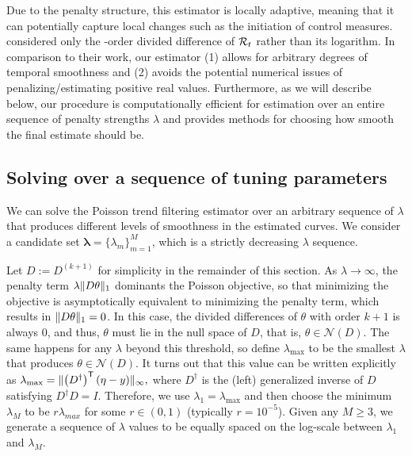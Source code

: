 Due to the penalty structure, this estimator is locally adaptive,
meaning that it can potentially capture local changes such as the initiation of
control measures. \cite{abry2020spatial,pascal2022nonsmooth} considered only the
\second-order divided difference of $\mathcal{R}_t$ rather than its logarithm. In
comparison to their work, our estimator (1) allows for arbitrary degrees of
temporal smoothness and (2) avoids the potential numerical issues of
penalizing/estimating positive real values. Furthermore, as we will describe
below, our procedure is computationally efficient for estimation over an entire
sequence of penalty strengths $\lambda$ and provides methods for choosing how
smooth the final estimate should be.


\subsection{Solving over a sequence of tuning parameters}
\label{sec:candidate-set}

We can solve the Poisson trend filtering estimator over an arbitrary sequence of 
$\lambda$ that produces different levels of smoothness in the estimated curves. 
We consider a candidate set $\boldsymbol{\lambda} = \{\lambda_m\}_{m=1}^M$, 
which is a strictly decreasing $\lambda$ sequence.%

Let $D := D^{(k+1)}$ for simplicity in the remainder of this section. As
$\lambda \to\infty$, the penalty term $\lambda \lVert D\theta \rVert_1$ dominants the
Poisson objective, so that minimizing the objective is asymptotically equivalent
to minimizing the penalty term, which results in $\lVert D\theta \rVert_1 = 0$. In
this case, the divided differences of $\theta$ with order $k+1$ is always $0$,
and thus, $\theta$ must lie in the null space of $D$, that is,
$\theta\in\mathcal{N}(D)$. The same happens for any $\lambda$ beyond this
threshold, so define $\lambda_{\textrm{max}}$ to be the smallest $\lambda$ that
produces $\theta\in\mathcal{N}(D)$. It turns out that this value can be written
explicitly as $\lambda_{\textrm{max}} = \lVert \left(D^{\dagger}\right)^{\mathsf{T}} \left(\eta
- y\right) \rVert_{\infty},$ where $D^{\dagger}$ is the (left) generalized inverse of $D$
satisfying $D^{\dagger} D = I$. Therefore, we use $\lambda_1 =
\lambda_{\textrm{max}}$ and then choose the minimum $\lambda_M$ to be
$r\lambda_{max}$ for some $r \in (0,1)$ (typically $r=10^{-5}$). Given any
$M\geq 3$, we generate a sequence of $\lambda$ values to be equally spaced on
the log-scale between $\lambda_1$ and $\lambda_M$. 

